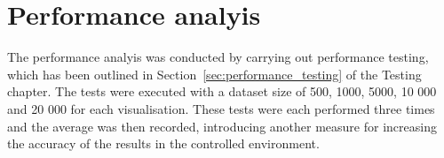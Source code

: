 \section{Performance analyis} {
\label{sec:performance_analysis}


	The performance analyis was conducted by carrying out performance testing, which has been outlined in Section~\ref{sec:performance_testing} of the Testing chapter. The tests were executed with a dataset size of 500, 1000, 5000, 10 000 and 20 000 for each visualisation. These tests were each performed three times and the average was then recorded, introducing another measure for increasing the accuracy of the results in the controlled environment.

}

